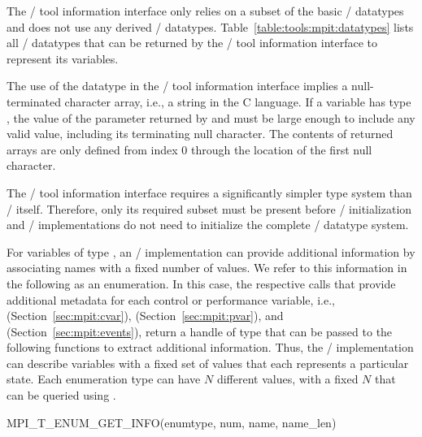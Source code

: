The \MPI/ tool information interface only relies on a subset of the basic
\MPI/ datatypes and does not use any derived \MPI/ datatypes.
Table~\ref{table:tools:mpit:datatypes} lists all \MPI/ datatypes that can
be returned by the \MPI/ tool information interface to represent its
variables.

The use of the datatype  in the \MPI/ tool information
interface implies a null-terminated character array, i.e., a string in the
C language.  If a variable has type , the value of the
 parameter returned by 
and  must  be large enough to include
any valid value, including its terminating null character.  The contents of
returned  arrays are only defined from index 0 through the
location of the first null character.

\begin{rationale}
The \MPI/ tool information interface requires a significantly simpler type
system than \MPI/ itself.  Therefore, only its required subset must be
present before \MPI/ initialization and \MPI/ implementations do not need
to initialize the complete \MPI/ datatype system.
\end{rationale}

For variables of type , an \MPI/ implementation can provide
additional information by associating names with a fixed number of values.
We refer to this information in the following as an enumeration.  In this
case, the respective calls that provide additional metadata for each
control or performance variable, i.e., 
(Section~\ref{sec:mpit:cvar}), 
(Section~\ref{sec:mpit:pvar}), and 
(Section~\ref{sec:mpit:events}), return a handle of type
 that can be passed to the
following functions to extract additional information.  Thus, the \MPI/
implementation can describe variables with a fixed set of values that each
represents a particular state.  Each enumeration type can have $N$
different values, with a fixed $N$ that can be queried using
.

\begin{funcdef}{MPI\_T\_ENUM\_GET\_INFO}{(\mbox{enumtype}, \mbox{num}, \mbox{name}, \mbox{name\_len})}
\end{funcdef}

